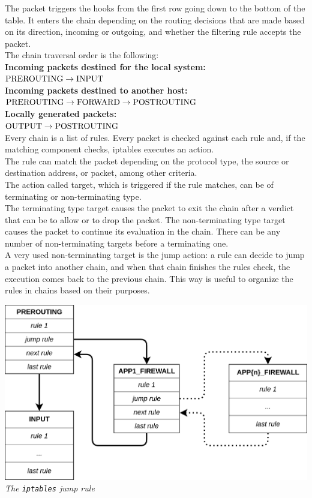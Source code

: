 \documentclass[12pt]{article}
\begin{document}
	
	\bigbreak

	The packet triggers the hooks from the first row going down to the bottom of the table. It enters the chain depending on the routing decisions that are made based on its direction, incoming or outgoing, and whether the filtering rule accepts the packet.\\
	\bigbreak
	The chain traversal order is the following:\\	
	\textbf{Incoming packets destined for the local system:}\\
	$\hbox{PREROUTING} \rightarrow \hbox{INPUT}$\\
	\medskip
	\textbf{Incoming packets destined to another host:}\\
	$\hbox{PREROUTING} \rightarrow \hbox{FORWARD} \rightarrow \hbox{POSTROUTING}$\\
	\medskip
	\textbf{Locally generated packets:}\\
	$\hbox{OUTPUT} \rightarrow \hbox{POSTROUTING}$\\

	\bigbreak
	Every chain is a list of rules. Every packet is checked against each rule and, if the matching component checks, iptables executes an action.\\
	The rule can match the packet depending on the protocol type, the source or destination address, or packet, among other criteria.\\
	The action called target, which is triggered if the rule matches, can be of terminating or non-terminating type.\\
	The terminating type target causes the packet to exit the chain after a verdict that can be to allow or to drop the packet. The non-terminating type target causes the packet to continue its evaluation in the chain. There can be any number of non-terminating targets before a terminating one.\\
	A very used non-terminating target is the jump action: a rule can decide to jump a packet into another chain, and when that chain finishes the rules check, the execution comes back to the previous chain. This way is useful to organize the rules in chains based on their purposes.\\
	
	\bigbreak
	\begin{center}
		\includegraphics[width=\linewidth]{images/iptables_jump_chains.png}\\
		\small{\textit{The \lstinline{iptables} jump rule}}
	\end{center}
	\bigbreak
\end{document}
